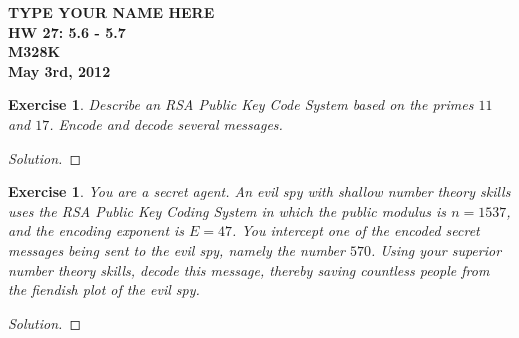\documentclass[12pt,leqno]{article}
\numberwithin{equation}{section}
\newtheorem{exer}[thm]{Exercise}
\theoremstyle{definition}
\begin{document}
\thispagestyle{plain}
\begin{flushright}
\large{\textbf{TYPE YOUR NAME HERE \\
HW 27: 5.6 - 5.7\\
M328K \\
May 3rd, 2012 \\}}
\end{flushright}

\markboth{}{} \setcounter{section}{0} \baselineskip=18pt

\setcounter{tocdepth}{4}



\setcounter{section}{5}

\setcounter{thm}{5}

\begin{exer}
Describe an RSA Public Key Code System based on the primes $11$ and
$17$.  Encode and decode several messages.
\end{exer}
\begin{proof}[Solution]
\end{proof}

\begin{exer}
You are a secret agent. An evil spy with shallow number theory
skills uses the RSA Public Key Coding System in which the public
modulus is $n=1537$, and the encoding exponent is $E=47$. You
intercept one of the encoded secret messages being sent to the evil
spy, namely the number $570$. Using your superior number theory
skills, decode this message, thereby saving countless people from
the fiendish plot of the evil spy.
\end{exer}
\begin{proof}[Solution]
\end{proof}
\end{document}
